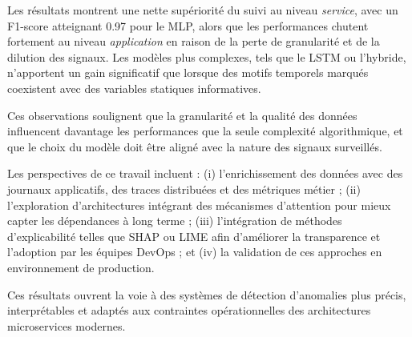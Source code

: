 \documentclass[conference]{IEEEtran}
\begin{document}
Les résultats montrent une nette supériorité du suivi au niveau \textit{service}, avec un F1-score atteignant 0.97 pour le MLP, alors que les performances chutent fortement au niveau \textit{application} en raison de la perte de granularité et de la dilution des signaux. Les modèles plus complexes, tels que le LSTM ou l’hybride, n’apportent un gain significatif que lorsque des motifs temporels marqués coexistent avec des variables statiques informatives.

Ces observations soulignent que la granularité et la qualité des données influencent davantage les performances que la seule complexité algorithmique, et que le choix du modèle doit être aligné avec la nature des signaux surveillés.

Les perspectives de ce travail incluent : (i) l’enrichissement des données avec des journaux applicatifs, des traces distribuées et des métriques métier ; (ii) l’exploration d’architectures intégrant des mécanismes d’attention pour mieux capter les dépendances à long terme ; (iii) l’intégration de méthodes d’explicabilité telles que SHAP ou LIME afin d’améliorer la transparence et l’adoption par les équipes DevOps ; et (iv) la validation de ces approches en environnement de production.

Ces résultats ouvrent la voie à des systèmes de détection d’anomalies plus précis, interprétables et adaptés aux contraintes opérationnelles des architectures microservices modernes.


\nocite{*}


\end{document}

